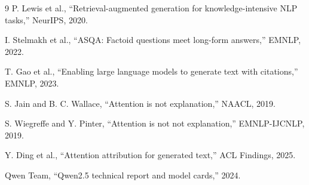 \documentclass[conference]{IEEEtran}
\begin{document}
\begin{thebibliography}{9}
P. Lewis et al., ``Retrieval-augmented generation for knowledge-intensive NLP tasks,'' NeurIPS, 2020.

I. Stelmakh et al., ``ASQA: Factoid questions meet long-form answers,'' EMNLP, 2022.

T. Gao et al., ``Enabling large language models to generate text with citations,'' EMNLP, 2023.

S. Jain and B. C. Wallace, ``Attention is not explanation,'' NAACL, 2019.

S. Wiegreffe and Y. Pinter, ``Attention is not not explanation,'' EMNLP-IJCNLP, 2019.

Y. Ding et al., ``Attention attribution for generated text,'' ACL Findings, 2025.

Qwen Team, ``Qwen2.5 technical report and model cards,'' 2024.

\end{thebibliography}
\end{document}
